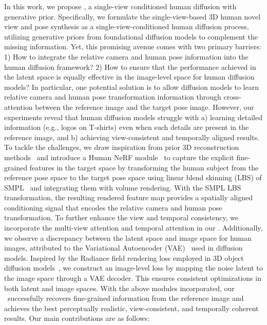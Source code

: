 In this work, we propose \textbf{\nickname}, a single-view conditioned human diffusion with generative prior. 
Specifically, we formulate the single-view-based 3D human novel view and pose synthesis as a single-view-conditioned human diffusion process, utilizing generative priors from foundational diffusion models to complement the missing information. 
Yet, this promising avenue comes with two primary barriers: 
1) How to integrate the relative camera and human pose information into the human diffusion framework?
2) How to ensure that the performance achieved in the latent space is equally effective in the image-level space for human diffusion models?
In particular, one potential solution is to allow diffusion models to learn relative camera and human pose transformation information through cross-attention between the reference image and the target pose image.
However, our experiments reveal that human diffusion models struggle with a) learning detailed information (e.g., logos on T-shirts) even when such details are present in the reference image, and b) achieving view-consistent and temporally aligned results.
To tackle the challenges, we draw inspiration from prior 3D reconstruction methods~\cite{hu2023sherf, wu2024reconfusion} and introduce a Human NeRF module~\cite{hu2023sherf} to capture the explicit fine-grained features in the target space by transforming the human subject from the reference pose space to the target pose space using linear blend skinning (LBS) of SMPL~\cite{SMPL:2015} and integrating them with volume rendering.
With the SMPL LBS transformation, the resulting rendered feature map provides a spatially aligned conditioning signal that encodes the relative camera and human pose transformation.
To further enhance the view and temporal consistency, we incorporate the multi-view attention and temporal attention in our \nickname{}.
Additionally, we observe a discrepancy between the latent space and image space for human images, attributed to the Variational Autoencoder (VAE)~\cite{kingma2019introduction} used in diffusion models.
Inspired by the Radiance field rendering loss employed in 3D object diffusion models~\cite{muller2023diffrf}, we construct an image-level loss by mapping the noise latent to the image space through a VAE decoder.
This ensures consistent optimizations in both latent and image spaces.
With the above modules incorporated, our \nickname\ successfully recovers fine-grained information from the reference image and achieves the best perceptually realistic, view-consistent, and temporally coherent results.
Our main contributions are as follows:
